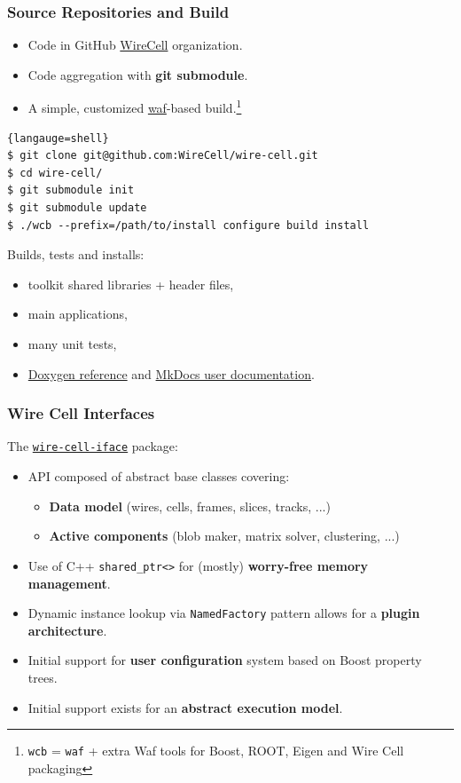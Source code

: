 \documentclass[xcolor=dvipsnames]{beamer}
\begin{document}
\begin{frame}[fragile]
  \frametitle{Source Repositories and Build}

  \begin{itemize}
  \item Code in GitHub \href{https://github.com/WireCell/}{WireCell} organization.
  \item Code aggregation with \textbf{git submodule}.
  \item A simple, customized \href{https://waf.io/}{waf}-based build.\footnote{\texttt{wcb} = \texttt{waf} + extra Waf tools for Boost, ROOT, Eigen and Wire Cell packaging}
  

  \end{itemize}

  \begin{lstlisting}{langauge=shell}
$ git clone git@github.com:WireCell/wire-cell.git
$ cd wire-cell/
$ git submodule init
$ git submodule update
$ ./wcb --prefix=/path/to/install configure build install
  \end{lstlisting}

  Builds, tests and installs:
  \begin{itemize}
  \item toolkit shared libraries + header files,
  \item main applications,
  \item many unit tests,
  \item \href{http://www.phy.bnl.gov/wire-cell/doxy/html/}{Doxygen reference} and \href{http://wirecell.github.io/wire-cell-docs/}{MkDocs user documentation}.
  \end{itemize}


\end{frame}

\begin{frame}[fragile]
  \frametitle{Wire Cell Interfaces}

  The \href{https://github.com/WireCell/wire-cell-iface}{\texttt{wire-cell-iface}} package:

  \begin{itemize}
  \item API composed of abstract base classes covering:
    \begin{itemize}
    \item \textbf{Data model} (wires, cells, frames, slices, tracks, ...)
    \item \textbf{Active components} (blob maker, matrix solver, clustering, ...)
    \end{itemize}
  \item Use of C++ \verb|shared_ptr<>| for (mostly) \textbf{worry-free memory management}.
  \item Dynamic instance lookup via \texttt{NamedFactory} pattern
    allows for a \textbf{plugin architecture}.
  \item Initial support for \textbf{user configuration} system based on Boost
    property trees.
  \item Initial support exists for an \textbf{abstract execution model}.
  \end{itemize}
\end{frame}
\end{document}
